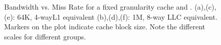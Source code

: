{\begin{figure}[ht]

  \caption[Bandwidth vs. Miss Rate]{Bandwidth vs. Miss Rate for a fixed granularity cache and \AC{}. (a),(c),(e): 64K, 4-wayL1 equivalent (b),(d),(f): 1M, 8-way LLC equivalent.  Markers on the plot indicate cache block size. Note the different scales for different groups.}
  \label{fig:eval_scatter_bw_64k_1m}
\end{figure}

\clearpage



\begin{figure}[!h]
  \centering


\end{figure}}
